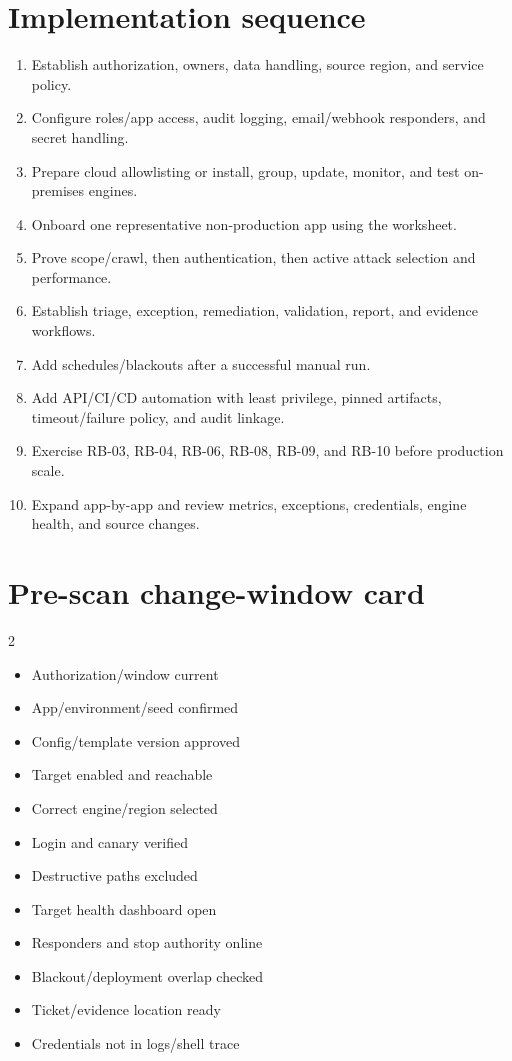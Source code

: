 \documentclass[11pt,letterpaper,oneside]{scrreprt}
\begin{document}
\section{Implementation sequence}
\begin{enumerate}
  \item Establish authorization, owners, data handling, source region, and service policy.
  \item Configure roles/app access, audit logging, email/webhook responders, and secret handling.
  \item Prepare cloud allowlisting or install, group, update, monitor, and test on-premises engines.
  \item Onboard one representative non-production app using the worksheet.
  \item Prove scope/crawl, then authentication, then active attack selection and performance.
  \item Establish triage, exception, remediation, validation, report, and evidence workflows.
  \item Add schedules/blackouts after a successful manual run.
  \item Add API/CI/CD automation with least privilege, pinned artifacts, timeout/failure policy, and audit linkage.
  \item Exercise RB-03, RB-04, RB-06, RB-08, RB-09, and RB-10 before production scale.
  \item Expand app-by-app and review metrics, exceptions, credentials, engine health, and source changes.
\end{enumerate}

\section{Pre-scan change-window card}
\begin{multicols}{2}
\begin{itemize}
  \item[$\square$] Authorization/window current
  \item[$\square$] App/environment/seed confirmed
  \item[$\square$] Config/template version approved
  \item[$\square$] Target enabled and reachable
  \item[$\square$] Correct engine/region selected
  \item[$\square$] Login and canary verified
  \item[$\square$] Destructive paths excluded
  \item[$\square$] Target health dashboard open
  \item[$\square$] Responders and stop authority online
  \item[$\square$] Blackout/deployment overlap checked
  \item[$\square$] Ticket/evidence location ready
  \item[$\square$] Credentials not in logs/shell trace
\end{itemize}
\end{multicols}
\end{document}
